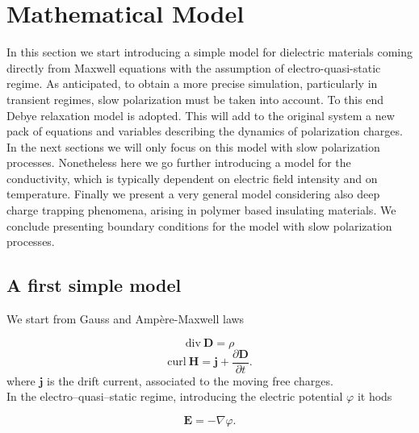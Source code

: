 \documentclass[11pt,a4paper]{article}
\begin{document}
\section{Mathematical Model}\label{sec:mat-model}
In this section we start introducing a simple model for dielectric materials coming directly from Maxwell equations with the assumption of electro-quasi-static regime. As anticipated, to obtain a more precise simulation, particularly in transient regimes, slow polarization must be taken into account. To this end Debye relaxation model is adopted. This will add to the original system a new pack of equations and variables describing the dynamics of polarization charges. In the next sections we will only focus on this model with slow polarization processes. Nonetheless  here we go further introducing a model for the conductivity, which is typically dependent on electric field intensity and on temperature. Finally we present a very general model considering also deep charge trapping phenomena, arising in polymer based insulating materials. We conclude presenting boundary conditions for the model with slow polarization processes.
\subsection{A first simple model}
We start from Gauss and Ampère-Maxwell laws

\begin{equation}
	\mathrm{div}\  \mathbf{D}  = \rho 
	\label{eq:Maxwell1}
\end{equation}
\begin{equation}
	\mathrm{curl}\ \mathbf{H} = \mathbf{j} + \dfrac{\partial \mathbf{D}}{\partial t}.
	\label{eq:Maxwell2}
\end{equation}
where \(\mathbf{j}\) is the drift current, associated to the moving free charges.\\
In the electro--quasi--static regime, introducing the electric potential \(\varphi\) it hods

\begin{equation} 
	\mathbf{E} = - \nabla \varphi.
	\label{eq:Epotential}
\end{equation}
\end{document}
